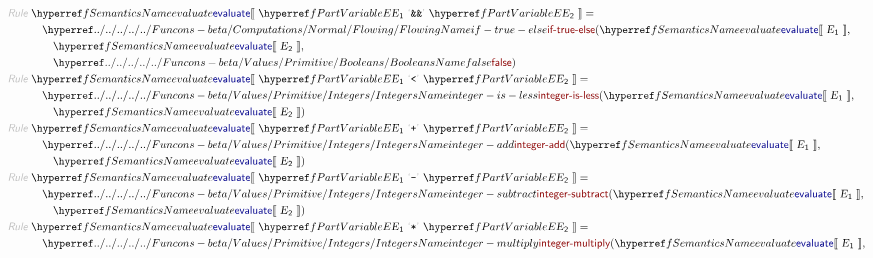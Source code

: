 \begin{align*}
  \KEY{Rule} ~ 
    & \SEMREF{evaluate} \LEFTPHRASE ~ \VARREF{E}\SUB{1} ~ \LEX{\AMPERSAND \AMPERSAND } ~ \VARREF{E}\SUB{2} ~ \RIGHTPHRASE  = \\&\quad
      \NAMEHYPER{../../../../../Funcons-beta/Computations/Normal}{Flowing}{if-true-else}
        ( \SEMREF{evaluate} \LEFTPHRASE ~ \VAR{E}\SUB{1} ~ \RIGHTPHRASE , \\&\quad \quad 
          \SEMREF{evaluate} \LEFTPHRASE ~ \VAR{E}\SUB{2} ~ \RIGHTPHRASE , \\&\quad \quad 
          \NAMEHYPER{../../../../../Funcons-beta/Values/Primitive}{Booleans}{false} )
\\
  \KEY{Rule} ~ 
    & \SEMREF{evaluate} \LEFTPHRASE ~ \VARREF{E}\SUB{1} ~ \LEX{<{}} ~ \VARREF{E}\SUB{2} ~ \RIGHTPHRASE  = \\&\quad
      \NAMEHYPER{../../../../../Funcons-beta/Values/Primitive}{Integers}{integer-is-less}
        ( \SEMREF{evaluate} \LEFTPHRASE ~ \VAR{E}\SUB{1} ~ \RIGHTPHRASE , \\&\quad \quad 
          \SEMREF{evaluate} \LEFTPHRASE ~ \VAR{E}\SUB{2} ~ \RIGHTPHRASE  )
\\
  \KEY{Rule} ~ 
    & \SEMREF{evaluate} \LEFTPHRASE ~ \VARREF{E}\SUB{1} ~ \LEX{+{}} ~ \VARREF{E}\SUB{2} ~ \RIGHTPHRASE  = \\&\quad
      \NAMEHYPER{../../../../../Funcons-beta/Values/Primitive}{Integers}{integer-add}
        ( \SEMREF{evaluate} \LEFTPHRASE ~ \VAR{E}\SUB{1} ~ \RIGHTPHRASE , \\&\quad \quad 
          \SEMREF{evaluate} \LEFTPHRASE ~ \VAR{E}\SUB{2} ~ \RIGHTPHRASE  )
\\
  \KEY{Rule} ~ 
    & \SEMREF{evaluate} \LEFTPHRASE ~ \VARREF{E}\SUB{1} ~ \LEX{-{}} ~ \VARREF{E}\SUB{2} ~ \RIGHTPHRASE  = \\&\quad
      \NAMEHYPER{../../../../../Funcons-beta/Values/Primitive}{Integers}{integer-subtract}
        ( \SEMREF{evaluate} \LEFTPHRASE ~ \VAR{E}\SUB{1} ~ \RIGHTPHRASE , \\&\quad \quad 
          \SEMREF{evaluate} \LEFTPHRASE ~ \VAR{E}\SUB{2} ~ \RIGHTPHRASE  )
\\
  \KEY{Rule} ~ 
    & \SEMREF{evaluate} \LEFTPHRASE ~ \VARREF{E}\SUB{1} ~ \LEX{*{}} ~ \VARREF{E}\SUB{2} ~ \RIGHTPHRASE  = \\&\quad
      \NAMEHYPER{../../../../../Funcons-beta/Values/Primitive}{Integers}{integer-multiply}
        ( \SEMREF{evaluate} \LEFTPHRASE ~ \VAR{E}\SUB{1} ~ \RIGHTPHRASE , \\&\quad \quad 

\end{align*}
